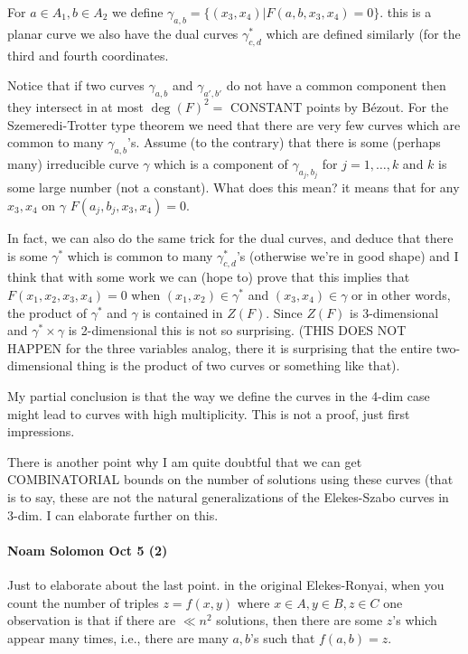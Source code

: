 For $a\in A_1, b \in A_2$ we define
$\gamma_{a,b} = \{(x_3,x_4) | F(a,b,x_3,x_4)=0\}$.
this is a planar curve
we also have the dual curves $\gamma^*_{c,d}$ which are defined similarly (for
the third and fourth coordinates.

Notice that if two curves $\gamma_{a,b}$ and $\gamma_{a',b'}$ do not have a
common component then they intersect in at most $\deg(F)^2=$ CONSTANT points
by B\'ezout.
For the Szemeredi-Trotter type theorem we need that there are very few
curves which are common to many $\gamma_{a,b}$'s.
Assume (to the contrary) that there is some (perhaps many) irreducible
curve $\gamma$ which is a component of
$\gamma_{a_j,b_j}$ for $j=1,\ldots, k$ and $k$ is some large number (not a
constant).
What does this mean? it means that for any $x_3,x_4$ on $\gamma$
$F(a_j,b_j, x_3,x_4)=0$.

In fact, we can also do the same trick for the dual curves, and deduce that
there is some $\gamma^*$ which is common to many $\gamma^*_{c,d}$'s
(otherwise we're in good shape) and I think that with some work we can
(hope to) prove that this implies that
$F(x_1,x_2,x_3,x_4)=0$ when $(x_1,x_2)\in \gamma^*$ and $(x_3,x_4)\in \gamma$
or in other words, the product of $\gamma^*$ and $\gamma$ is contained in $Z(F)$.
Since $Z(F)$ is 3-dimensional and $\gamma^*\times \gamma$ is 2-dimensional this
is not so surprising. (THIS DOES NOT HAPPEN for the three variables analog,
there it is surprising that the entire two-dimensional thing is the product
of two curves or something like that).

My partial conclusion is that the way we define the curves in the 4-dim
case might lead to curves with high multiplicity. This is not a proof, just
first impressions.

There is another point why I am quite doubtful that we can get
COMBINATORIAL bounds on the number of solutions using these curves (that is
to say, these are not the natural generalizations of the Elekes-Szabo
curves in 3-dim. I can elaborate further on this.

\paragraph{Noam Solomon Oct 5 (2)}
Just to elaborate about the last point.
in the original Elekes-Ronyai, when you count the number of triples
$z=f(x,y)$ where $x\in A, y\in B, z\in C$
one observation is that if there are $\ll n^2$ solutions, then there are some
$z$'s which appear many times, i.e., there are many $a,b$'s such that $f(a,b)=z$.

